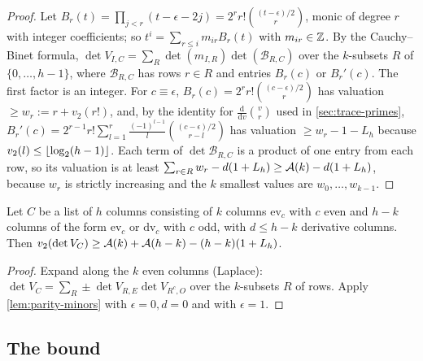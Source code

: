 \begin{proof}
Let $B_r(t)=\prod_{j<r}(t-\epsilon-2j)=2^rr!\binom{(t-\epsilon)/2}{r}$, monic of degree $r$ with integer
coefficients; so $t^i=\sum_{r\le i}m_{ir}B_r(t)$ with $m_{ir}\in\mathbb{Z}$. By the Cauchy--Binet formula,
$\det V_{I,C}=\sum_{R}\det(m_{I,R})\det(\mathcal B_{R,C})$ over the $k$-subsets $R$ of $\{0,\dots,h-1\}$,
where $\mathcal B_{R,C}$ has rows $r\in R$ and entries $B_r(c)$ or $B_r'(c)$. The first factor is an
integer. For $c\equiv\epsilon$, $B_r(c)=2^rr!\binom{(c-\epsilon)/2}r$ has valuation $\ge w_r:=r+v_2(r!)$,
and, by the identity for $\frac{\mathrm d}{\mathrm dv}\binom vr$ used in \cref{sec:trace-primes},
$B_r'(c)=2^{r-1}r!\sum_{l=1}^r\frac{(-1)^{l-1}}l\binom{(c-\epsilon)/2}{r-l}$ has valuation
$\ge w_r-1-L_h$ because $v_2(l)\le\left\lfloor \log_2(h-1)\right\rfloor$. Each term of $\det\mathcal B_{R,C}$ is a product of
one entry from each row, so its valuation is at least $\sum_{r\in R}w_r-d(1+L_h)\ge\mathcal{A}(k)-d(1+L_h)$,
because $w_r$ is strictly increasing and the $k$ smallest values are $w_0,\dots,w_{k-1}$.
\end{proof}

\begin{corollary}\label{cor:parity-full}
Let $C$ be a list of $h$ columns consisting of $k$ columns $\mathrm{ev}_{c}$ with $c$ even and $h-k$ columns of
the form $\mathrm{ev}_c$ or $\mathrm{dv}_c$ with $c$ odd, with $d\le h-k$ derivative columns. Then
$v_2(\det V_C)\ge\mathcal{A}(k)+\mathcal{A}(h-k)-(h-k)(1+L_h)$.
\end{corollary}

\begin{proof}
Expand along the $k$ even columns (Laplace): $\det V_C=\sum_{R}\pm\det V_{R,E}\det V_{R^c,O}$ over the
$k$-subsets $R$ of rows. Apply \cref{lem:parity-minors} with $\epsilon=0,d=0$ and with $\epsilon=1$.
\end{proof}

\subsection{The bound}\label{subsec:two-bound}

